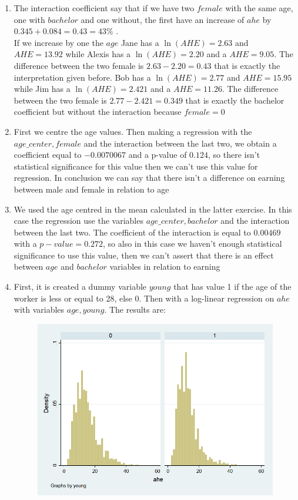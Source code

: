 \documentclass[10pt,a4paper]{article}
\begin{document}
\begin{enumerate}
	\item The interaction coefficient say that if we have two $ female $ with the same age, one with $ bachelor $ and one without, the first have an increase of $ ahe $ by $ 0.345 + 0.084 = 0.43 = 43\% $ .\\
	If we increase by one the $ age $  		
	Jane has a $ \ln(AHE) = 2.63 $ and $ AHE = 13.92 $ while Alexis has a $ \ln(AHE) = 2.20 $ and a $ AHE = 9.05 $. The difference between the two female is $ 2.63 - 2.20 = 0.43 $ that is exactly the interpretation given before.
	Bob has a $ \ln(AHE) = 2.77 $ and $ AHE = 15.95 $ while Jim has a $ \ln(AHE) = 2.421 $ and a $ AHE = 11.26 $. The difference between the two female is $ 2.77 - 2.421 = 0.349 $ that is exactly the bachelor coefficient but without the interaction because $ female = 0 $
	\item First we centre the age values. Then making a regression with the $ age\_center, female $ and the interaction between the last two, we obtain a coefficient equal to $ -0.0070067 $ and a p-value of $  0.124 $,  so there isn't statistical significance for this value then we can't use this value for regression. In conclusion we can say that there isn't a difference on earning between male and female in relation to age
	\item We used the age centred in the mean calculated in the latter exercise. In this case the regression use the variables  $ age\_center, bachelor $ and the interaction between the last two. The coefficient of the interaction is equal to $ 0.00469 $ with a $ p-value = 0.272 $, so also in this case we haven't enough statistical significance to use this value, then we can't assert that there is an effect between $ age $ and $ bachelor $ variables in relation to earning
	\item First, it is created a dummy variable $ young $ that has value 1 if the age of the worker is less or equal to 28, else 0. Then with a log-linear regression on $ ahe $ with variables $ age, young $. The results are:
	\begin{figure}[H]
		\centering
		\includegraphics[width=0.7\linewidth]{hist_ahe_young}
	\end{figure}
	

\end{enumerate}
\end{document}

